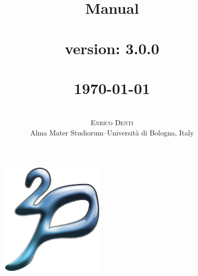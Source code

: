 \documentclass[11pt]{report}
\title{{\Huge{\bf{\tuprolog{} Manual\\\mbox{ }\\}}}
        \tuprolog{} version: 3.0.0\\\mbox{ }\\
{\small\today\\}
}
\author{ \mbox{ }\\ \textsc{Enrico Denti}\\Alma Mater Studiorum--Universit\`{a} di Bologna, Italy
}
\date{}
\newcommand\logo{
    \begin{figure}[tp]
        \begin{center}
            \includegraphics[width=5cm]{images/logo}
        \end{center}
\end{figure}
}
\begin{document}
\logo

\maketitle

\tableofcontents













\end{document}
